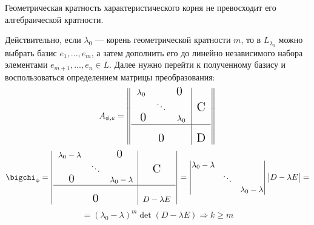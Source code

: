 \begin{thm}
Геометрическая кратность характеристического корня не превосходит его алгебраической кратности.
\end{thm}
Действительно, если $\lambda_0$ --- корень геометрической кратности $m$, то в $L_{\lambda_0}$ можно выбрать базис $e_1,...,e_m$, а затем дополнить его до линейно независимого набора элементами $e_{m+1},...,e_n \in L$. Далее нужно перейти к полученному базису и воспользоваться определением матрицы преобразования:
\begin{equation*}
A_{\phi,e}=
\begin{Vmatrix}
\begin{tabular}{ccc|c}
  $\lambda_0$ & 			&$\fudge{0 }$& \\
     			& $\ddots$ 	& 			& $\fudge C$ \\
  $\fudge{ 0}$&			& $\lambda_0$ & \\ \hline
     			&  			& 			& \\
     			& $\fudge 0$ 	& 			& $\fudge D$ \\
\end{tabular} 
\end{Vmatrix} 
\end{equation*}
\begin{equation*}
\bigchi_\phi=
\begin{vmatrix}
\begin{tabular}{ccc|c}
  $\lambda_0-\lambda$ & 			&$\fudge{0 }$ 			& \\
     			& $\ddots$ 	& 			& $\fudge C$ \\
  $\fudge{ 0}$&			& $\lambda_0-\lambda$ & \\ \hline
     			&  			& 			& \\
     			& $\fudge 0$ 	& 			& $ D-\lambda E$ \\
\end{tabular} 
\end{vmatrix} = \begin{vmatrix}
    \lambda_0-\lambda & 			& \\
     			& \ddots 	&  \\
     			&  & \lambda_0-\lambda\\ 
\end{vmatrix} \begin{vmatrix}
D-\lambda E
\end{vmatrix}=
\end{equation*}
\begin{equation}
=(\lambda_0-\lambda)^m \det(D-\lambda E) \Rightarrow k \ge m
\end{equation}
